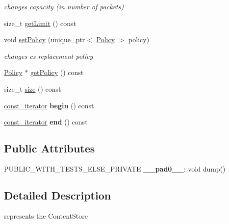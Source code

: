 \begin{DoxyCompactItemize}
\begin{DoxyCompactList}\small\item\em changes capacity (in number of packets) \end{DoxyCompactList}\item 
size\+\_\+t \hyperlink{classnfd_1_1cs_1_1Cs_a4241a4c6d68fb889491432831eee5abe}{get\+Limit} () const
\item 
void \hyperlink{classnfd_1_1cs_1_1Cs_a72946e983564cd2c992bfcfb8ed93e62}{set\+Policy} (unique\+\_\+ptr$<$ \hyperlink{classnfd_1_1cs_1_1Policy}{Policy} $>$ policy)
\begin{DoxyCompactList}\small\item\em changes cs replacement policy \end{DoxyCompactList}\item 
\hyperlink{classnfd_1_1cs_1_1Policy}{Policy} $\ast$ \hyperlink{classnfd_1_1cs_1_1Cs_a2bcf86fe2a4763ff433afbad80730ef4}{get\+Policy} () const
\item 
size\+\_\+t \hyperlink{classnfd_1_1cs_1_1Cs_a38361ebbc6eef772d5b4ba4b209c0814}{size} () const
\item 
\hyperlink{classnfd_1_1cs_1_1Cs_a59777b86bdfb8755c9e0429fb1317a1d}{const\+\_\+iterator} {\bfseries begin} () const\hypertarget{classnfd_1_1cs_1_1Cs_ad85d986d758ccea7d61b9fb1cdd849b9}{}\label{classnfd_1_1cs_1_1Cs_ad85d986d758ccea7d61b9fb1cdd849b9}

\item 
\hyperlink{classnfd_1_1cs_1_1Cs_a59777b86bdfb8755c9e0429fb1317a1d}{const\+\_\+iterator} {\bfseries end} () const\hypertarget{classnfd_1_1cs_1_1Cs_ad1acb9b4fc7948e2012ef5f8761d4e22}{}\label{classnfd_1_1cs_1_1Cs_ad1acb9b4fc7948e2012ef5f8761d4e22}

\end{DoxyCompactItemize}
\subsection*{Public Attributes}
\begin{DoxyCompactItemize}
\item 
P\+U\+B\+L\+I\+C\+\_\+\+W\+I\+T\+H\+\_\+\+T\+E\+S\+T\+S\+\_\+\+E\+L\+S\+E\+\_\+\+P\+R\+I\+V\+A\+TE {\bfseries \+\_\+\+\_\+pad0\+\_\+\+\_\+}\+: void dump()\hypertarget{classnfd_1_1cs_1_1Cs_ab0b9630c26ee5eddee0bdfbc399c7b90}{}\label{classnfd_1_1cs_1_1Cs_ab0b9630c26ee5eddee0bdfbc399c7b90}

\end{DoxyCompactItemize}


\subsection{Detailed Description}
represents the Content\+Store 

